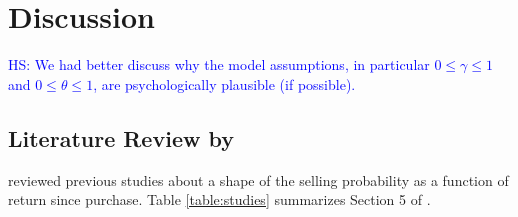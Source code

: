 \documentclass[11pt, a4paper]{article}
\newcommand{\HS}[1]{\textcolor{blue}{HS: #1}}
\begin{document}
\section{Discussion}
\HS{We had better discuss why the model assumptions, in particular $0\leq \gamma \leq 1$ and $0\leq \theta \leq 1$, are psychologically plausible (if possible).}



\clearpage
\begin{appendices}
\section{Literature Review by \citet{BenDavidHirshleifer12}}
	\label{appendix:bendavid_hirshleifer}
	\renewcommand*{\thetable}{A\arabic{table}}%
	\renewcommand*{\thefigure}{A\arabic{figure}}%
	\renewcommand*{\theequation}{A\arabic{equation}}%
	\setcounter{table}{0}
	\setcounter{figure}{0}
	\setcounter{equation}{0}

\citet{BenDavidHirshleifer12} reviewed previous studies about a shape of the selling probability as a function of return since purchase. Table \ref{table:studies} summarizes Section 5 of \citet{BenDavidHirshleifer12}.


\end{appendices}
\end{document}
